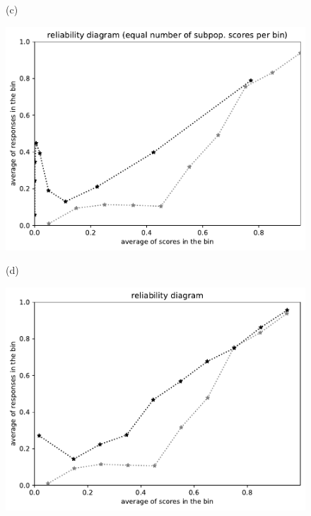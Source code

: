 \documentclass{article}
\newlength{\vertsep}
\newlength{\imsize}
\begin{document}
\begin{figure}
\begin{centering}
(c)
\parbox{\imsize}{\includegraphics[width=\imsize]
{../codes/unweighted/10000_7000_10_1/equisamps.pdf}}
\quad\quad
(d)
\parbox{\imsize}{\includegraphics[width=\imsize]
{../codes/unweighted/10000_7000_10_1/equiscore.pdf}}

\vspace{\vertsep}


\end{centering}
\end{figure}
\end{document}
